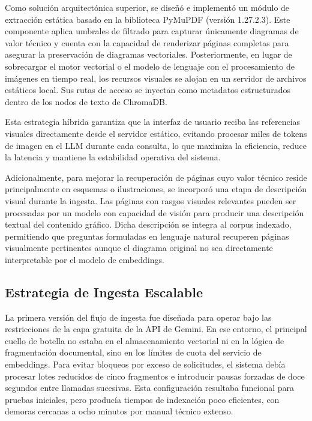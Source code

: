 {{Como solución arquitectónica superior, se diseñó e implementó un módulo de extracción estática basado en la biblioteca PyMuPDF (versión 1.27.2.3). Este componente aplica umbrales de filtrado para capturar únicamente diagramas de valor técnico y cuenta con la capacidad de renderizar páginas completas para asegurar la preservación de diagramas vectoriales. Posteriormente, en lugar de sobrecargar el motor vectorial o el modelo de lenguaje con el procesamiento de imágenes en tiempo real, los recursos visuales se alojan en un servidor de archivos estáticos local. Sus rutas de acceso se inyectan como metadatos estructurados dentro de los nodos de texto de ChromaDB.

Esta estrategia híbrida garantiza que la interfaz de usuario reciba las referencias visuales directamente desde el servidor estático, evitando procesar miles de tokens de imagen en el LLM durante cada consulta, lo que maximiza la eficiencia, reduce la latencia y mantiene la estabilidad operativa del sistema.

Adicionalmente, para mejorar la recuperación de páginas cuyo valor técnico reside principalmente en esquemas o ilustraciones, se incorporó una etapa de descripción visual durante la ingesta. Las páginas con rasgos visuales relevantes pueden ser procesadas por un modelo con capacidad de visión para producir una descripción textual del contenido gráfico. Dicha descripción se integra al corpus indexado, permitiendo que preguntas formuladas en lenguaje natural recuperen páginas visualmente pertinentes aunque el diagrama original no sea directamente interpretable por el modelo de embeddings.

\subsection{Estrategia de Ingesta Escalable}

La primera versión del flujo de ingesta fue diseñada para operar bajo las restricciones de la capa gratuita de la API de Gemini. En ese entorno, el principal cuello de botella no estaba en el almacenamiento vectorial ni en la lógica de fragmentación documental, sino en los límites de cuota del servicio de embeddings. Para evitar bloqueos por exceso de solicitudes, el sistema debía procesar lotes reducidos de cinco fragmentos e introducir pausas forzadas de doce segundos entre llamadas sucesivas. Esta configuración resultaba funcional para pruebas iniciales, pero producía tiempos de indexación poco eficientes, con demoras cercanas a ocho minutos por manual técnico extenso.

}}
